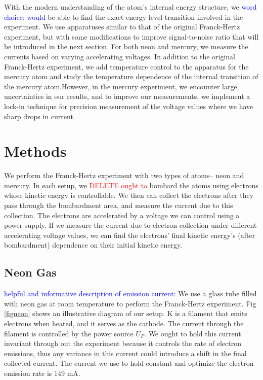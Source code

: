 \documentclass[prb,preprint]{revtex4-1}
\begin{document}
With the modern understanding of the atom's internal energy structure, we \textcolor{blue}{word choice: would} be able to find the exact energy level transition involved in the experiment. We use apparatuses similar to that of the original Franck-Hertz experiment, but with some modifications to improve signal-to-noise ratio that will be introduced in the next section. For both neon and mercury, we measure the currents based on varying accelerating voltages. In addition to the original Franck-Hertz experiment, we add temperature control to the apparatus for the mercury atom and study the temperature dependence of the internal transition of the mercury atom.However, in the mercury experiment, we encounter large uncertainties in our results, and to improve our measurements, we implement a lock-in technique for precision measurement of the voltage values where we have sharp drops in current.

\section{Methods}

We perform the Franck-Hertz experiment with two types of atoms-- neon and mercury. In each setup, we \textcolor{red}{DELETE ought to} bombard the atoms using electrons whose kinetic energy is controllable. We then can collect the electrons after they pass through the bombardment area, and measure the current due to this collection. The electrons are accelerated by a voltage we can control using a power supply. If we measure the current due to electron collection under different accelerating voltage values, we can find the electrons' final kinetic energy's (after bombardment) dependence on their initial kinetic energy.

\subsection{Neon Gas}

\textcolor{blue}{helpful and informative description of emission current:} We use a glass tube filled with neon gas at room temperature to perform the Franck-Hertz experiment. Fig \ref{figneon} shows an illustrative diagram of our setup. K is a filament that emits electrons when heated, and it serves as the cathode. The current through the filament is controlled by the power source $U_{F}$. We ought to hold this current invariant through out the experiment because it controls the rate of electron emissions, thus any variance in this current could introduce a shift in the final collected current. The current we use to hold constant and optimize the electron emission rate is 149 mA.
\end{document}
